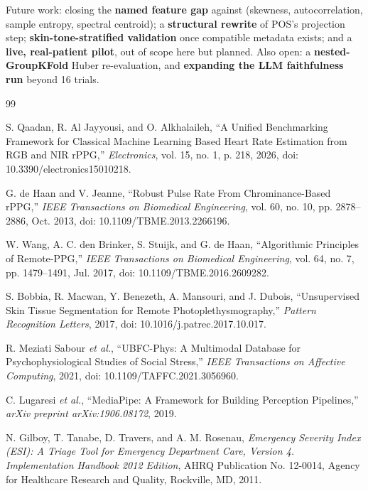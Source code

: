 \documentclass[conference]{IEEEtran}
\begin{document}
Future work: closing the \textbf{named feature gap} against \cite{b_qaadan} (skewness, autocorrelation, sample entropy, spectral centroid); a \textbf{structural rewrite} of POS's projection step; \textbf{skin-tone-stratified validation} once compatible metadata exists; and a \textbf{live, real-patient pilot}, out of scope here but planned. Also open: a \textbf{nested-GroupKFold} Huber re-evaluation, and \textbf{expanding the LLM faithfulness run} beyond 16 trials.

\begin{thebibliography}{99}
\scriptsize
\setlength{\itemsep}{0pt}
\setlength{\parskip}{0pt}
\setlength{\parsep}{0pt}
\setlength{\topsep}{0pt}

S. Qaadan, R. Al Jayyousi, and O. Alkhalaileh, ``A Unified Benchmarking Framework for Classical Machine Learning Based Heart Rate Estimation from RGB and NIR rPPG,'' \emph{Electronics}, vol. 15, no. 1, p. 218, 2026, doi: 10.3390/electronics15010218.

G. de Haan and V. Jeanne, ``Robust Pulse Rate From Chrominance-Based rPPG,'' \emph{IEEE Transactions on Biomedical Engineering}, vol. 60, no. 10, pp. 2878--2886, Oct. 2013, doi: 10.1109/TBME.2013.2266196.

W. Wang, A. C. den Brinker, S. Stuijk, and G. de Haan, ``Algorithmic Principles of Remote-PPG,'' \emph{IEEE Transactions on Biomedical Engineering}, vol. 64, no. 7, pp. 1479--1491, Jul. 2017, doi: 10.1109/TBME.2016.2609282.

S. Bobbia, R. Macwan, Y. Benezeth, A. Mansouri, and J. Dubois, ``Unsupervised Skin Tissue Segmentation for Remote Photoplethysmography,'' \emph{Pattern Recognition Letters}, 2017, doi: 10.1016/j.patrec.2017.10.017.

R. Meziati Sabour \emph{et al.}, ``UBFC-Phys: A Multimodal Database for Psychophysiological Studies of Social Stress,'' \emph{IEEE Transactions on Affective Computing}, 2021, doi: 10.1109/TAFFC.2021.3056960.

C. Lugaresi \emph{et al.}, ``MediaPipe: A Framework for Building Perception Pipelines,'' \emph{arXiv preprint arXiv:1906.08172}, 2019.

N. Gilboy, T. Tanabe, D. Travers, and A. M. Rosenau, \emph{Emergency Severity Index (ESI): A Triage Tool for Emergency Department Care, Version 4. Implementation Handbook 2012 Edition}, AHRQ Publication No. 12-0014, Agency for Healthcare Research and Quality, Rockville, MD, 2011.


\end{thebibliography}
\end{document}
